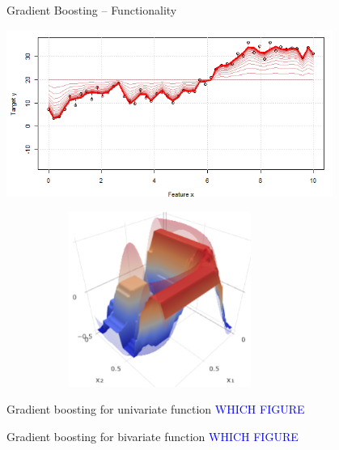 \documentclass[11pt,compress,t,notes=noshow, xcolor=table]{beamer}
\begin{document}
\begin{frame}{Gradient Boosting -- Functionality}
\begin{minipage}{0.5\textwidth}
  \includegraphics[width=0.8\textwidth]{figure/gb}
\end{minipage}%
\begin{minipage}{0.5\textwidth}
  \includegraphics[width=0.6\textwidth]{figure/gb_3d}
\end{minipage}
\begin{minipage}{0.5\textwidth}
  \tiny Gradient boosting for univariate function \textcolor{blue}{WHICH FIGURE}
\end{minipage}%
\begin{minipage}{0.5\textwidth}
  \tiny Gradient boosting for bivariate function \textcolor{blue}{WHICH FIGURE}
\end{minipage}

\end{frame}

\end{document}
